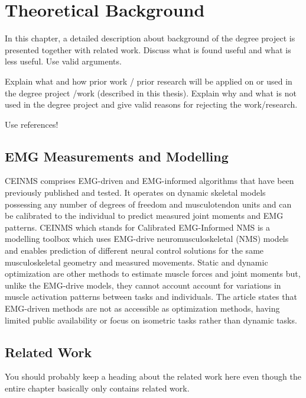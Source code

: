 \section{Theoretical Background}
In this chapter, a detailed description about background of the degree project is presented together with related work. Discuss what is found useful and what is less useful. Use valid arguments. 

Explain what and how prior work / prior research will be applied on or used in the degree project /work (described in this thesis). Explain why and what is not used in the degree project and give valid reasons for rejecting the work/research.

Use references!

\subsection{EMG Measurements and Modelling}
CEINMS comprises EMG-driven and EMG-informed algorithms that have been previously published and tested. 
It operates on dynamic skeletal models possessing any number of degrees of freedom and musculotendon units and can be calibrated to the individual to predict measured joint moments and EMG patterns.\cite{Pizzolato2015} 
CEINMS which stands for Calibrated EMG-Informed NMS is a modelling toolbox which uses EMG-drive neuromusculoskeletal (NMS) models and enables prediction of different neural control solutions for the same musculoskeletal geometry and measured movements. 
Static and dynamic optimization are other methods to estimate muscle forces and joint moments but, unlike the EMG-drive models, they cannot account account for variations in muscle activation patterns between tasks and individuals.
The article states that EMG-driven methods are not as accessible as optimization methods, having limited public availability or focus on isometric tasks rather than dynamic tasks.


\subsection{Related Work}
You should probably keep a heading about the related work here even though the entire chapter basically only contains related work.
